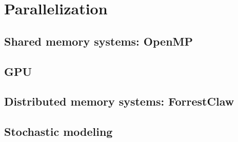 \chapter{Parallelization}\label{ChapParallel}
\section{Shared memory systems: OpenMP}\label{ChapParallelSecOpenMP}
\section{GPU}\label{ChapParallelSecGPU}
\section{Distributed memory systems: ForrestClaw}\label{ChapParallelSecForrest}
\section{Stochastic modeling}\label{ChapParallelStoc}

